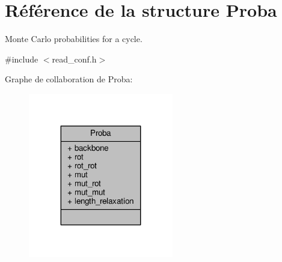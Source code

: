 \hypertarget{struct_proba}{\section{Référence de la structure Proba}
\label{struct_proba}
}


Monte Carlo probabilities for a cycle.  




{\ttfamily \#include $<$read\+\_\+conf.\+h$>$}



Graphe de collaboration de Proba\+:\nopagebreak
\begin{figure}[H]
\begin{center}
\leavevmode
\includegraphics[width=179pt]{struct_proba__coll__graph}
\end{center}
\end{figure}

